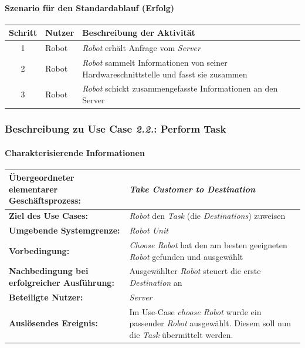				\paragraph*{Szenario für den Standardablauf (Erfolg)}
				
				\begin{table}[H]
					\centering
					\begin{tabularx}{\textwidth}{|c|p{2cm}|X|}
						\hline
						Schritt & Nutzer & Beschreibung der Aktivität \\ \hline
						1 & Robot & \emph{Robot} erhält Anfrage vom \emph{Server} \\
						2 & Robot & \emph{Robot} sammelt Informationen von seiner Hardwareschnittstelle und fasst sie zusammen \\
						3 & Robot & \emph{Robot} schickt zusammengefasste Informationen an den Server \\
						\hline
					\end{tabularx}
				\end{table}
				
				
				\pagebreak
				
			\subsubsection{Beschreibung zu Use Case \emph{2.2.}: Perform Task}
				
				\paragraph*{Charakterisierende Informationen}
				
				\begin{table}[H]
					\centering
					\begin{tabularx}{\textwidth}{|p{5cm}|X|}
						\hline
						\textbf{Übergeordneter elementarer Geschäftsprozess:} & \emph{Take Customer to Destination} \\ \hline
						\textbf{Ziel des Use Cases:} & \emph{Robot} den \emph{Task} (die \emph{Destinations}) zuweisen\\ \hline
						\textbf{Umgebende Systemgrenze:} & \emph{Robot Unit} \\ \hline
						\textbf{Vorbedingung:} & \textit{ \glqq Choose Robot \grqq } hat den am besten geeigneten \emph{Robot} gefunden und ausgewählt\\ \hline
						\textbf{Nachbedingung bei erfolgreicher Ausführung:} & Ausgewählter \emph{Robot} steuert die erste \emph{Destination} an\\ \hline
						\textbf{Beteiligte Nutzer:} & \emph{Server} \\ \hline
						\textbf{Auslösendes Ereignis:} & Im Use-Case \textit{ \glqq choose Robot \grqq } wurde ein passender \emph{Robot} ausgewählt. Diesem soll nun die \emph{Task} übermittelt werden. \\
						\hline
					\end{tabularx}
				\end{table}
				
